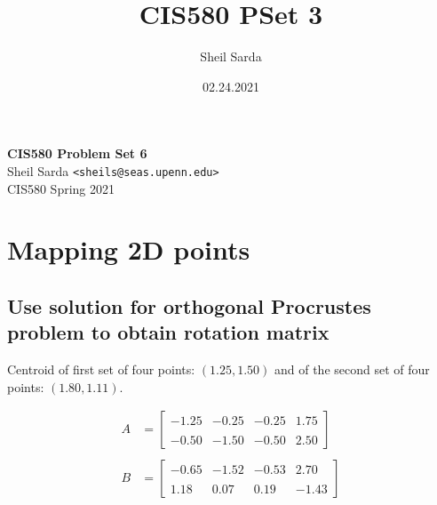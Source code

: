 \documentclass[12pt, oneside]{article}
\title{CIS580 PSet 3}
\author{Sheil Sarda}
\date{02.24.2021}
\begin{document}

\begin{titlepage}
    \begin{flushleft}
        \vspace*{1cm}
        \Huge
        \textbf{CIS580 Problem Set 6\\ }
        \vspace*{0.5cm}
        \normalsize
        Sheil Sarda \verb|<sheils@seas.upenn.edu>| \\
        CIS580 Spring 2021
        \tableofcontents
    \end{flushleft}
\end{titlepage}

\section{Mapping 2D points}

\subsection{Use solution for orthogonal Procrustes problem to obtain rotation 
matrix}

Centroid of first set of four points: $(1.25, 1.50)$ and of the 
second set of four points: $(1.80, 1.11)$.

\begin{align*}
    A    &= 
    \begin{bmatrix} -1.25 & -0.25 & -0.25 & 1.75\\ \\ 
                    -0.50 & -1.50 & -0.50 & 2.50
    \end{bmatrix} \\ \\
    B    &= 
    \begin{bmatrix} -0.65 & -1.52 & -0.53 & 2.70\\ \\ 
                    1.18 &  0.07 &  0.19 & -1.43
    \end{bmatrix} 
\end{align*}
\end{document}

